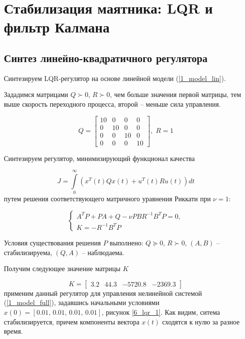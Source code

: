 \chapter{Стабилизация маятника: LQR и фильтр Калмана}
\label{ch:chap6}

\section{Синтез линейно-квадратичного регулятора}
Синтезируем LQR-регулятор на основе линейной модели (\ref{1_model_lin}).

Зададимся матрицами $Q \succ 0$, $R \succ 0$, чем больше значения первой матрицы, тем выше скорость переходного процесса, второй -- меньше сила управления.

\begin{equation}
    Q = \begin{bmatrix}
10 & 0 & 0 & 0\\
0 & 10 & 0 & 0\\
0 & 0 & 10 & 0\\
0 & 0 & 0 & 10
    \end{bmatrix}, \, \, R = 1
\end{equation}

Синтезируем регулятор, минимизирующий функционал качества

\begin{equation}
	J = \int \limits_0^\infty (x^T(t)Qx(t) + u^T(t)Ru(t))dt
\end{equation}
путем решения соответствующего матричного уравнения Риккати при $\nu=1$:

\begin{equation}
	\begin{cases}
		A^TP+PA+Q-\nu PBR^{-1}B^TP = 0,\\
		K = -R^{-1}B^TP
	\end{cases}
\end{equation}

Условия существования решения $P$ выполнено: $Q \succeq 0$, $R \succ 0$, $(A,B)$ -- стабилизируема, $(Q,A)$ -- наблюдаема.

Получим следующее значение матрицы $K$

\begin{equation}
	K = \begin{bmatrix}
		3.2 &   44.3 &  -5720.8   &-2369.3
	\end{bmatrix}
\end{equation}
применим данный регулятор для управления нелинейной системой (\ref{1_model_full}), задавшись начальными условиями $x(0) = [0.01, \, 0.01, \, 0.01, \, 0.01]$, рисунок \ref{6_lqr_1}. Как видим, ситема стабилизируется, причем компоненты вектора $x(t)$ сходятся к нулю за разное время.

